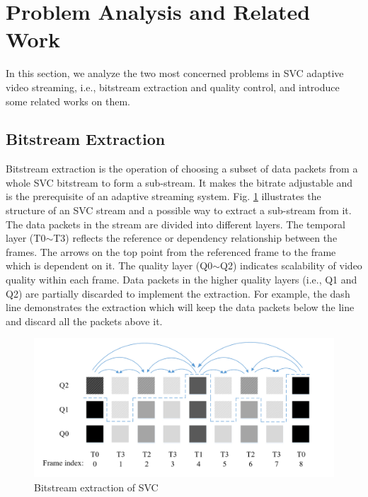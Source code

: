 \documentclass[journal]{IEEEtran}
\begin{document}
\section{Problem Analysis and Related Work}
\label{sec:analysis}

In this section, we analyze the two most concerned problems in SVC adaptive video streaming, i.e., bitstream extraction and quality control, and introduce some related works on them.

\subsection{Bitstream Extraction}
\label{subsec:analysis-extraction}

Bitstream extraction is the operation of choosing a subset of data packets from a whole SVC bitstream to form a sub-stream. It makes the bitrate adjustable and is the prerequisite of an adaptive streaming system. Fig. \ref{fig:Bitstream-Extraction} illustrates the structure of an SVC stream and a possible way to extract a sub-stream from it. The data packets in the stream are divided into different layers. The temporal layer (T0$\sim$T3) reflects the reference or dependency relationship between the frames. The arrows on the top point from the referenced frame to the frame which is dependent on it. The quality layer (Q0$\sim$Q2) indicates scalability of video quality within each frame. Data packets in the higher quality layers (i.e., Q1 and Q2) are partially discarded to implement the extraction. For example, the dash line demonstrates the extraction which will keep the data packets below the line and discard all the packets above it. 

\begin{figure}[h]
\centering
\includegraphics[width = 1.0\linewidth]{Bitstream-Extraction.jpg}
\caption{Bitstream extraction of SVC \label{fig:Bitstream-Extraction}}
\end{figure}
\end{document}
